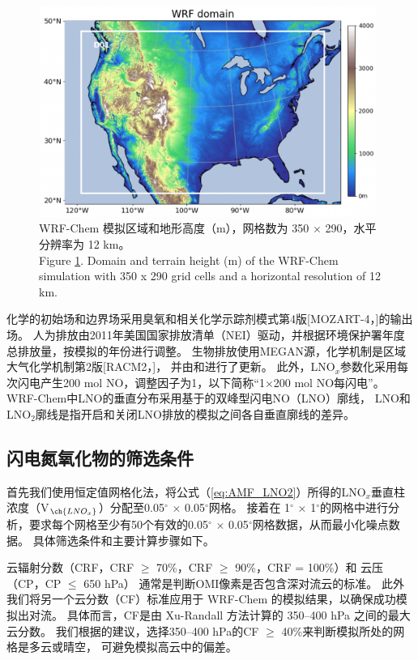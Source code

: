 \begin{figure}[H]
\centering
\includegraphics[width=11cm]{./figures/us_domain.png}
\caption{WRF-Chem 模拟区域和地形高度（m），网格数为 350 $\times$ 290，水平分辨率为 12 km。 \\
Figure \ref{fig:us_domain}. Domain and terrain height (m) of the WRF-Chem simulation with 350 x 290 grid cells and a horizontal resolution of 12 km.}
\label{fig:us_domain}
\end{figure}

化学的初始场和边界场采用臭氧和相关化学示踪剂模式第4版[MOZART-4，\citet{Emmons.2010}]的输出场。
人为排放由2011年美国国家排放清单（NEI）驱动，并根据环境保护署年度总排放量，按模拟的年份进行调整\citep{EPA.2015}。
生物排放使用MEGAN源，化学机制是区域大气化学机制第2版[RACM2，\citet{Goliff.2013}]，
并由\citet{Browne.2014}和\citet{Schwantes.2015}进行了更新。
此外，LNO$_x$参数化采用每次闪电产生200 mol NO，调整因子为1，以下简称“1$\times$200 mol NO每闪电”。
WRF-Chem中LNO的垂直分布采用基于\citet{Ott.2010}的双峰型闪电NO（LNO）廓线\citep{Laughner.2017}，
LNO和LNO$_2$廓线是指开启和关闭LNO排放的模拟之间各自垂直廓线的差异。


\subsection{闪电氮氧化物的筛选条件}

首先我们使用恒定值网格化法，将公式（\ref{eq:AMF_LNO2}）所得的LNO$_x$垂直柱浓度（V$_{\ch{LNO_x}}$）分配至0.05$^{\circ}$ $\times$ 0.05$^{\circ}$网格\citep{Kuhlmann.2014}。
接着在 1$^{\circ}$ $\times$ 1$^{\circ}$的网格中进行分析，要求每个网格至少有50个有效的0.05$^{\circ}$ $\times$ 0.05$^{\circ}$网格数据，从而最小化噪点数据。
具体筛选条件和主要计算步骤如下。

云辐射分数（CRF，CRF $\geq$ 70\%，CRF $\geq$ 90\%，CRF = 100\%）和 云压（CP，CP $\leq$ 650 hPa）
通常是判断OMI像素是否包含深对流云的标准\citep{Ziemke.2009,Choi.2014,Pickering.2016}。
此外我们将另一个云分数（CF）标准应用于 WRF-Chem 的模拟结果，以确保成功模拟出对流。
具体而言，CF是由 Xu-Randall 方法计算的 350--400 hPa 之间的最大云分数\citep{Xu.1996,Strode.2017}。
我们根据\citet{Strode.2017}的建议，选择350--400 hPa的CF $\geq$ 40\%来判断模拟所处的网格是多云或晴空，
可避免模拟高云中的偏差。

